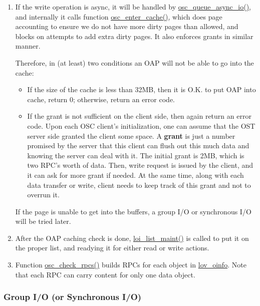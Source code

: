 \begin{enumerate}
\item If the write operation is async, it will be handled by
\url{osc_queue_async_io()}, and internally it calls function
\url{osc_enter_cache()}, which does page accounting to ensure we do not have
more dirty pages than allowed, and blocks on attempts to add extra dirty pages.
It also enforces grants in similar manner.

Therefore, in (at least) two conditions an OAP will not be able
to go into the cache:

  \begin{itemize}

  \item If the size of the cache is less than 32MB, then it is O.K. to put
	OAP into cache, return 0; otherwise, return an error code.

  \item If the grant is not sufficient on the client side, then again return an
	error code. Upon each OSC client's initialization, one can assume that the OST
	server side granted the client some space. A \textbf{grant} is just a number
	promised by the server that this client can flush out this much data and
	knowing the server can deal with it.  The initial grant is 2MB, which is two
	RPC's worth of data. Then, write request is issued by the client, and it can ask
	for more grant if needed. At the same time, along with each data transfer or
	write, client needs to keep track of this grant and not to overrun it.

  \end{itemize}

If the page is unable to get into the buffers, a group I/O or synchronous I/O
will be tried later.    

\item After the OAP caching check is done, \url{loi_list_maint()} is called to put
it on the proper list, and readying it for either read or write actions.

\item Function \url{osc_check_rpcs()} builds RPCs for each object in
\url{lov_oinfo}. Note that each RPC can carry content for only one data
object. 

\end{enumerate}

\subsubsection{Group I/O (or Synchronous I/O)}

